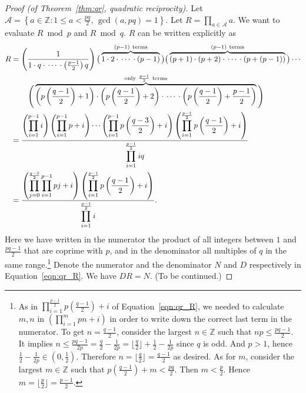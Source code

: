 \documentclass{amsbook}
\theoremstyle{plain}
\theoremstyle{definition}
\theoremstyle{remark}
\numberwithin{equation}{chapter}
\numberwithin{figure}{chapter}
\newcommand{\Z}{\mathbb{Z}}
\newcommand{\sA}{\mathcal{A}}
\begin{document}
\begin{proof}[Proof {\rm (of Theorem~\ref{thm:qr}, quadratic reciprocity)}]\renewcommand*{\qedsymbol}{}
Let $\sA = \left\{ a \in \Z : 1 \leqslant a < \frac{pq}2, \, \gcd (a, pq) = 1 \right\}$. Let $R = \prod_{a \in \sA} a$. We want to evaluate $R \bmod p$ and $R \bmod q$. $R$ can be written explicitly as
\begin{align}\label{eqn:qr_R}
  \begin{split}
    R &= \left(\frac{1}{ 1 \cdot q \cdot \, \cdots \, \cdot \left(\frac{p-1}2\right) q } \right) \big(\overbrace{ 1 \cdot 2 \cdot \, \cdots \, \cdot (p-1) }^{(p-1) {\rm ~terms}} \big)
    \big( \overbrace{(p+1) \cdot (p+2) \cdot \, \cdots \, \cdot (p + (p-1)) }^{(p-1) {\rm ~terms}} \big)
    \cdots \\
    & \hspace{7.8mm} \Bigg( \overbrace{ \left(p\left(\frac{q-1}2\right)+1\right) \cdot \left(p\left(\frac{q-1}2\right)+2\right) \cdot \, \cdots \, \cdot \left(p\left(\frac{q-1}2\right) + \frac{p-1}2\right) }^{{\rm only~}\frac{p-1}2 {\rm ~terms}} \Bigg) \\
    &=\frac{\displaystyle \left(\prod_{i=1}^{p-1} i \right) \left(\prod_{i=1}^{p-1} p+i\right) \cdots \left(\prod_{i=1}^{p-1} p\left( \frac{q-3}2 \right) + i\right) \left( \prod_{i=1}^{\frac{p-1}2} p\left( \frac{q-1}2 \right) + i \right)}{\displaystyle \prod_{i=1}^{\frac{p-1}2} iq} \\
    &=\frac{\displaystyle \left( \prod_{j=0}^{\frac{q-3}2} \prod_{i=1}^{p-1} pj + i \right) \left( \prod_{i=1}^{\frac{p-1}2} p\left( \frac{q-1}2 \right) + i \right) }{\displaystyle \prod_{i=1}^{\frac{p-1}2} i} . 
  \end{split}
\end{align}
Here we have written in the numerator the product of all integers between $1$ and $\frac{pq-1}2$ that are coprime with $p$, and in the denominator all multiples of $q$ in the same range.\footnote{As in $ \prod_{i=1}^{\frac{p-1}2} p\left( \frac{q-1}2 \right) + i $ of Equation~\eqref{eqn:qr_R}, we needed to calculate $m, n$ in $\left( \prod_{i=1}^m pn + i \right) $ in order to write down the correct last term in the numerator. To get $n = \frac{q-1}2$, consider the largest $n \in \Z$ such that $np \leqslant \frac{pq-1}2$. It implies $n \leqslant \frac{pq-1}{2p} = \frac{q}2 - \frac{1}{2p} = \lfloor \frac{q}2 \rfloor + \frac{1}2 - \frac{1}{2p}$ since $q$ is odd. And $p > 1$, hence $\frac{1}2 - \frac{1}{2p} \in \left(0, \frac{1}2\right)$. Therefore $n = \lfloor \frac{q}2 \rfloor = \frac{q-1}2$ as desired. As for $m$, consider the largest $m \in \Z$ such that $p\left( \frac{q-1}2 \right) + m < \frac{pq}2$. Then $m < \frac{p}2$. Hence $m = \lfloor \frac{p}2 \rfloor = \frac{p-1}2 $.} Denote the numerator and the denominator $N$ and $D$ respectively in Equation~\eqref{eqn:qr_R}. We have $DR = N$. (To be continued.)
\end{proof}
\end{document}
